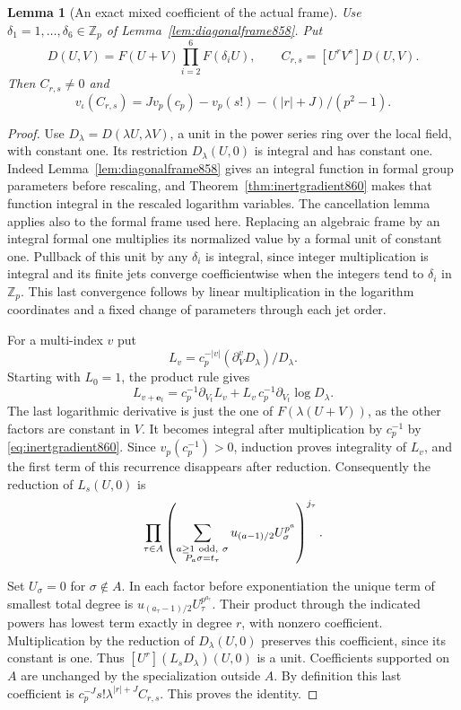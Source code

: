 \documentclass[a4paper,11pt]{article}
\newtheorem{lemma}[proposition]{Lemma}
\theoremstyle{definition}
\theoremstyle{remark}
\numberwithin{equation}{section}
\begin{document}
\begin{lemma}[An exact mixed coefficient of the actual frame]
\leavevmode\label{lem:paircoefficient861}
Use \(\delta_1=1,\ldots,\delta_6\in\mathbb Z_p\) of
Lemma~\ref{lem:diagonalframe858}. Put
\[
      D(U,V)=F(U+V)\prod_{i=2}^6 F(\delta_i U),\qquad
                      C_{r,s}=[U^rV^s]D(U,V).
\]
Then \(C_{r,s}\ne0\) and
\begin{equation}
     v_\iota(C_{r,s})
        = Jv_p(c_p)-v_p(s!)-(|r|+J)/(p^2-1).
 \label{eq:paircoefficient861}
\end{equation}
\end{lemma}
\begin{proof}
Use \(D_\lambda=D(\lambda U,\lambda V)\), a unit in the
power series ring over the local field, with constant one.
Its restriction \(D_\lambda(U,0)\) is integral and has
constant one. Indeed Lemma~\ref{lem:diagonalframe858} gives
an integral function in formal group parameters before
rescaling, and Theorem~\ref{thm:inertgradient860} makes
that function integral in the rescaled logarithm variables.
The cancellation lemma applies also to the formal frame
used here. Replacing an algebraic frame by an integral formal
one multiplies its normalized value by a formal unit of
constant one. Pullback of this unit by any \(\delta_i\) is
integral, since integer multiplication is integral and its
finite jets converge coefficientwise when the integers tend
to \(\delta_i\) in \(\mathbb Z_p\). This last convergence
follows by linear multiplication in the logarithm coordinates
and a fixed change of parameters through each jet order.

For a multi-index \(v\) put
\[
       L_v=c_p^{-|v|}(\partial_V^v D_\lambda)/D_\lambda .
\]
Starting with \(L_0=1\), the product rule gives
\[
 L_{v+\mathbf e_t}=c_p^{-1}\partial_{V_t}L_v+
           L_v\,c_p^{-1}\partial_{V_t}\log D_\lambda .
\]
The last logarithmic derivative is just the one of
\(F(\lambda(U+V))\), as the other factors are constant in
\(V\). It becomes integral after multiplication by \(c_p^{-1}\)
by \eqref{eq:inertgradient860}. Since \(v_p(c_p^{-1})>0\),
induction proves integrality of \(L_v\), and the first term
of this recurrence disappears after reduction.
Consequently the reduction of \(L_s(U,0)\) is
\[
   \prod_{\tau\in A}\left(
    \sum_{\substack{a\ge1\ {\rm odd},\ \sigma\\P_a\sigma=t_\tau}}
              u_{(a-1)/2} U_\sigma^{p^a}\right)^{j_\tau}.
\]

Set \(U_\sigma=0\) for \(\sigma\notin A\). In each factor
before exponentiation the unique term of smallest total degree
is \(u_{(a_\tau-1)/2}U_\tau^{p^{a_\tau}}\). Their product
through the indicated powers has lowest term exactly in degree
\(r\), with nonzero coefficient. Multiplication by the
reduction of \(D_\lambda(U,0)\) preserves this coefficient,
since its constant is one. Thus
\([U^r](L_s D_\lambda)(U,0)\) is a unit. Coefficients supported
on \(A\) are unchanged by the specialization outside \(A\).
By definition this last coefficient is
\(c_p^{-J}s!\lambda^{|r|+J} C_{r,s}\).
This proves the identity.
\end{proof}
\end{document}
